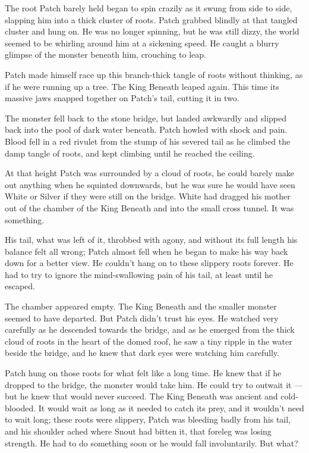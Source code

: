 \documentclass[ebook,oneside,openany,17pt]{memoir}
\begin{document}
The root Patch barely held began to spin crazily as it swung from side
to side, slapping him into a thick cluster of roots. Patch grabbed
blindly at that tangled cluster and hung on. He was no longer
spinning, but he was still dizzy, the world seemed to be whirling
around him at a sickening speed. He caught a blurry glimpse of the
monster beneath him, crouching to leap.

Patch made himself race up this branch-thick tangle of roots without
thinking, as if he were running up a tree. The King Beneath leaped
again. This time its massive jaws snapped together on Patch’s tail,
cutting it in two.

The monster fell back to the stone bridge, but landed awkwardly and
slipped back into the pool of dark water beneath. Patch howled with
shock and pain. Blood fell in a red rivulet from the stump of his
severed tail as he climbed the damp tangle of roots, and kept climbing
until he reached the ceiling.

At that height Patch was surrounded by a cloud of roots, he could
barely make out anything when he squinted downwards, but he was sure
he would have seen White or Silver if they were still on the
bridge. White had dragged his mother out of the chamber of the King
Beneath and into the small cross tunnel. It was something.

His tail, what was left of it, throbbed with agony, and without its
full length his balance felt all wrong; Patch almost fell when he
began to make his way back down for a better view. He couldn’t hang on
to these slippery roots forever. He had to try to ignore the
mind-swallowing pain of his tail, at least until he escaped.

The chamber appeared empty. The King Beneath and the smaller monster
seemed to have departed. But Patch didn’t trust his eyes. He watched
very carefully as he descended towards the bridge, and as he emerged
from the thick cloud of roots in the heart of the domed roof, he saw a
tiny ripple in the water beside the bridge, and he knew that dark eyes
were watching him carefully.

Patch hung on those roots for what felt like a long time. He knew that
if he dropped to the bridge, the monster would take him. He could try
to outwait it — but he knew that would never succeed. The King Beneath
was ancient and cold-blooded. It would wait as long as it needed to
catch its prey, and it wouldn’t need to wait long; these roots were
slippery, Patch was bleeding badly from his tail, and his shoulder
ached where Snout had bitten it, that foreleg was losing strength. He
had to do something soon or he would fall involuntarily. But what?
\end{document}
